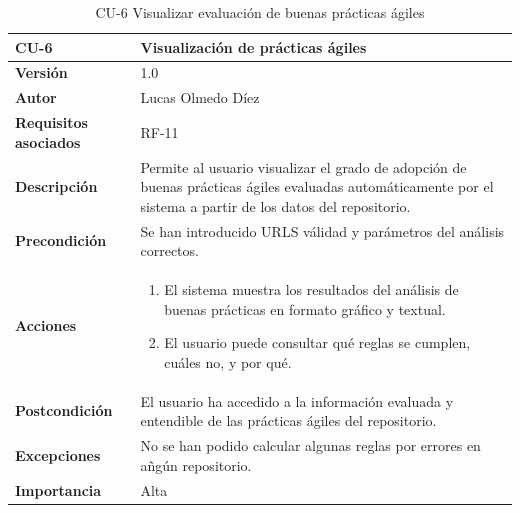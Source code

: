 \clearpage
\begin{table}[p]
    \centering
    \begin{tabularx}{\linewidth}{ p{} p{} }
        \toprule
        \textbf{CU-6} & Visualización de prácticas ágiles \\
        \midrule
        \textbf{Versión} & 1.0 \\
        \textbf{Autor} & Lucas Olmedo Díez \\
        \textbf{Requisitos asociados} & RF-11 \\
        \textbf{Descripción} & Permite al usuario visualizar el grado de adopción de buenas prácticas ágiles evaluadas automáticamente por el sistema a partir de los datos del repositorio. \\
        \textbf{Precondición} & Se han introducido URLS válidad y parámetros del análisis correctos. \\
        \textbf{Acciones} &
        \begin{enumerate}
            \def\labelenumi{\arabic{enumi}.}
            \tightlist
            \item El sistema muestra los resultados del análisis de buenas prácticas en formato gráfico y textual.
            \item El usuario puede consultar qué reglas se cumplen, cuáles no, y por qué.
        \end{enumerate}\\
        \textbf{Postcondición} & El usuario ha accedido a la información evaluada y entendible de las prácticas ágiles del repositorio. \\
        \textbf{Excepciones} & No se han podido calcular algunas reglas por errores en añgún repositorio. \\
        \textbf{Importancia} & Alta \\
        \bottomrule
    \end{tabularx}
    \caption{CU-6 Visualizar evaluación de buenas prácticas ágiles}
\end{table}

